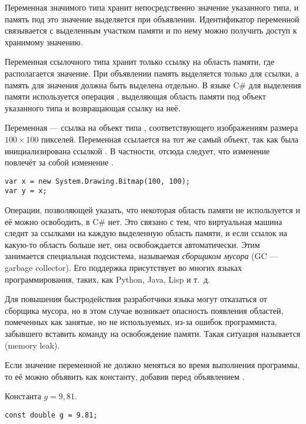 Переменная значимого типа хранит непосредственно значение указанного
типа, и память под это значение выделяется при
объявлении. Идентификатор переменной связывается с выделенным участком
памяти и по нему можно получить доступ к хранимому значению.

Переменная ссылочного типа хранит только ссылку на область памяти, где
располагается значение. При объявлении память выделяется только для
ссылки, а память для значения должна быть выделена отдельно. В языке
C\# для выделения памяти используется операция ,
выделяющая область памяти под объект указанного типа и возвращающая
ссылку на неё.

\begin{example}
Переменная  — ссылка на объект типа
, соответствующего
изображениям размера $100\times100$ пикселей.  Переменная 
ссылается на тот же самый объект, так как была инициализирована
ссылкой . В частности, отсюда следует, что изменение
 повлечёт за собой изменение .

\begin{lstlisting}
var x = new System.Drawing.Bitmap(100, 100);
var y = x;
\end{lstlisting}
\end{example}

Операции, позволяющей указать, что некоторая область памяти не
используется и её можно освободить, в C\# нет. Это связано с тем, что
виртуальная машина следит за ссылками на каждую выделенную область
памяти, и если ссылок на какую-то область больше нет, она
освобождается автоматически.  Этим занимается специальная подсистема,
называемая \emph{сборщиком мусора} (GC — garbage collector). Его
поддержка присутствует во многих языках программирования, таких, как
Python, Java, Lisp и т.~д.

Для повышения быстродействия разработчики языка могут отказаться от
сборщика мусора, но в этом случае возникает опасность появления
областей, помеченных как занятые, но не используемых, из-за ошибок
программиста, забывшего вставить команду на освобождение памяти. Такая
ситуация называется  (memory
leak).

Если значение переменной не должно меняться во время выполнения
программы, то её можно объявить как константу, добавив перед
объявлением .

\begin{example}
Константа $g=9{,}81.$

\begin{lstlisting}
const double g = 9.81;
\end{lstlisting}
\end{example}

